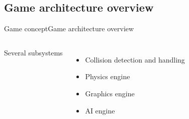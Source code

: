 \documentclass[10pt,compress]{beamer} %
\begin{document}
\subsection[Game architecture overview]{Game architecture overview}
\begin{frame}{Game concept}{Game architecture overview}
	\vspace{-0.2cm}
    \begin{columns}
	   	Several subsystems
		\begin{itemize}
		\item Collision detection and handling
		\item Physics engine
		\item Graphics engine
		\item AI engine
		\end{itemize}


\end{columns}
\end{frame}
\end{document}
